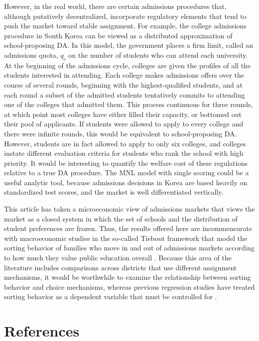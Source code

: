 \documentclass[12pt]{article}
\numberwithin{equation}{subsection}
\theoremstyle{definition}
\begin{document}
However, in the real world, there are certain admissions procedures that, although putatively decentralized, incorporate regulatory elements that tend to push the market toward stable assignment. For example, the college admissions procedure in South Korea can be viewed as a distributed approximation of school-proposing DA. In this model, the government places a firm limit, called an admissions quota, $q_c$ on the number of students who can attend each university. At the beginning of the admissions cycle, colleges are given the profiles of all the students interested in attending. Each college makes admissions offers over the course of several rounds, beginning with the highest-qualified students, and at each round a subset of the admitted students tentatively commits to attending one of the colleges that admitted them. This process continuous for three rounds, at which point most colleges have either filled their capacity, or bottomed out their pool of applicants. If students were allowed to apply to every college and there were infinite rounds, this would be equivalent to school-proposing DA. However, students are in fact allowed to apply to only six colleges, and colleges instate different evaluation criteria for students who rank the school with high priority. It would be interesting to quantify the welfare cost of these regulations relative to a true DA procedure. The MNL model with single scoring could be a useful analytic tool, because admissions decisions in Korea are based heavily on standardized test scores, and the market is well differentiated vertically.

This article has taken a microeconomic view of admissions markets that views the market as a closed system in which the set of schools and the distribution of student preferences are frozen. Thus, the results offered here are incommensurate with macroeconomic studies in the so-called Tiebout framework that model the sorting behavior of families who move in and out of admissions markets according to how much they value public education overall \parencite[][]{apuretheoryoflocalexpenditures, equilibriumandlocalredistribution}. Because this area of the literature includes comparisons across districts that use different assignment mechanisms, it would be worthwhile to examine the relationship between sorting behavior and choice mechanisms, whereas previous regression studies have treated sorting behavior as a dependent variable that must be controlled for \parencite[][]{doescompetitionamongpublicschools}.

\pagebreak
\section{References}
\printbibliography[heading=none]
\end{document}
